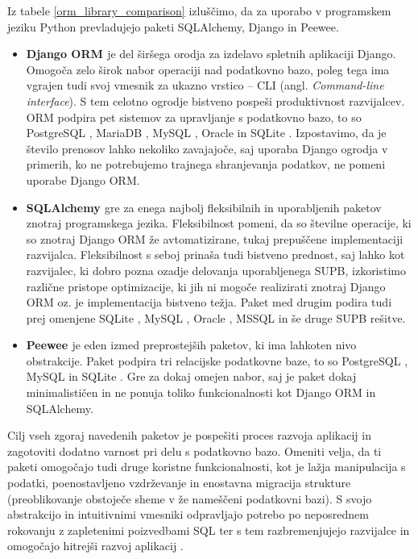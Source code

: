 \documentclass[a4paper,12pt,openright]{book}
\begin{document}
    \noindent
    Iz tabele \ref{orm_library_comparison} izluščimo, da za uporabo v programskem jeziku Python prevladujejo paketi SQLAlchemy, Django in Peewee.
    \begin{itemize}
        \item \textbf{Django ORM \cite{DJANGO_GITHUB}} je del širšega orodja za izdelavo spletnih aplikaciji Django. Omogoča zelo širok nabor operaciji nad podatkovno bazo, poleg tega ima vgrajen tudi svoj vmesnik za ukazno vrstico – CLI (angl. \textit{Command-line interface}). S tem celotno ogrodje bistveno pospeši produktivnost razvijalcev. ORM podpira pet sistemov za upravljanje s podatkovno bazo, to so PostgreSQL \cite{POSTGRESQL}, MariaDB \cite{MARIADB}, MySQL \cite{MYSQL}, Oracle \cite{ORACLE} in SQLite \cite{SQLITE}. Izpostavimo, da je število prenosov lahko nekoliko zavajajoče, saj uporaba Django ogrodja v primerih, ko ne potrebujemo trajnega shranjevanja podatkov, ne pomeni uporabe Django ORM.
        \item \textbf{SQLAlchemy \cite{SQLALCHEMY_GITHUB}} gre za enega najbolj fleksibilnih in uporabljenih paketov znotraj programskega jezika. Fleksibilnost pomeni, da so številne operacije, ki so znotraj Django ORM že avtomatizirane, tukaj prepušče\-ne implementaciji razvijalca. Fleksibilnost s seboj prinaša tudi bistveno prednost, saj lahko kot razvijalec, ki dobro pozna ozadje delovanja uporabljenega SUPB, izkoristimo različne pristope optimizacije, ki jih ni mogoče realizirati znotraj Django ORM oz. je implementacija bistveno težja. Paket med drugim podira tudi prej omenjene SQLite \cite{SQLITE}, MySQL \cite{MYSQL}, Oracle \cite{ORACLE}, MSSQL \cite{MSSQL} in še druge SUPB rešitve.
        \item \textbf{Peewee \cite{PEEWEE_GITHUB}} je eden izmed preprostejših paketov, ki ima lahkoten nivo obstrakcije. Paket podpira tri relacijske podatkovne baze, to so PostgreSQL \cite{POSTGRESQL}, MySQL \cite{MYSQL} in SQLite \cite{SQLITE}. Gre za dokaj omejen nabor, saj je paket dokaj minimalističen in ne ponuja toliko funkcionalnosti kot Django ORM in SQLAlchemy.
    \end{itemize}

    \noindent
    Cilj vseh zgoraj navedenih paketov je pospešiti proces razvoja aplikacij in zagotoviti dodatno varnost pri delu s podatkovno bazo. Omeniti velja, da ti paketi omogočajo tudi druge koristne funkcionalnosti, kot je lažja manipulacija s podatki, poenostavljeno vzdrževanje in enostavna migracija strukture (preoblikovanje obstoječe sheme v že nameščeni podatkovni bazi). S svojo abstrakcijo in intuitivnimi vmesniki odpravljajo potrebo po neposrednem rokovanju z zapletenimi poizvedbami SQL ter s tem razbremenjujejo razvijalce in omogočajo hitrejši razvoj aplikacij \cite{torres-17}.
\end{document}
